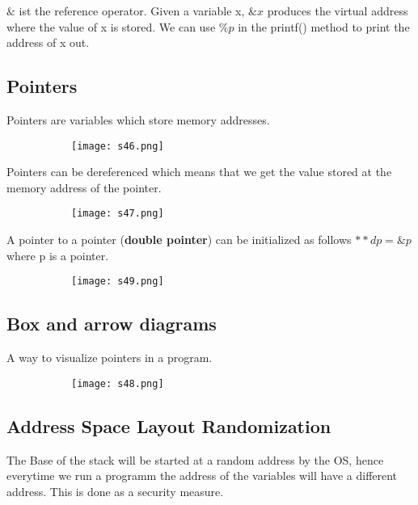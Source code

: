\documentclass[8pt]{extreport}
\begin{document}
$\&$ ist the reference operator. Given a variable x, $\&x$ produces the virtual address where the value of x is stored.
We can use $\%p$ in the printf() method to print the address of x out.

\subsection{Pointers}

Pointers are variables which store memory addresses.
\begin{figure}[H]
\centering
\begin{subfigure}[b]{0.4\linewidth}
\texttt{[image: s46.png]}
\end{subfigure}
\end{figure}
Pointers can be dereferenced which means that we get the value stored at the memory address of the pointer.
\begin{figure}[H]
\centering
\begin{subfigure}[b]{0.4\linewidth}
\texttt{[image: s47.png]}
\end{subfigure}
\end{figure}

A pointer to a pointer (\textbf{double pointer}) can be initialized as follows $**dp=\&p$ where p is a pointer.
\begin{figure}[H]
\centering
\begin{subfigure}[b]{0.4\linewidth}
\texttt{[image: s49.png]}
\end{subfigure}
\end{figure}
\subsection{Box and arrow diagrams}

A way to visualize pointers in a program.
\begin{figure}[H]
\centering
\begin{subfigure}[b]{0.4\linewidth}
\texttt{[image: s48.png]}
\end{subfigure}
\end{figure}

\subsection{Address Space Layout Randomization}

The Base of the stack will be started at a random address by the OS, hence everytime we run a programm the address of the variables will have a different address. This is done as a security measure.
\end{document}
